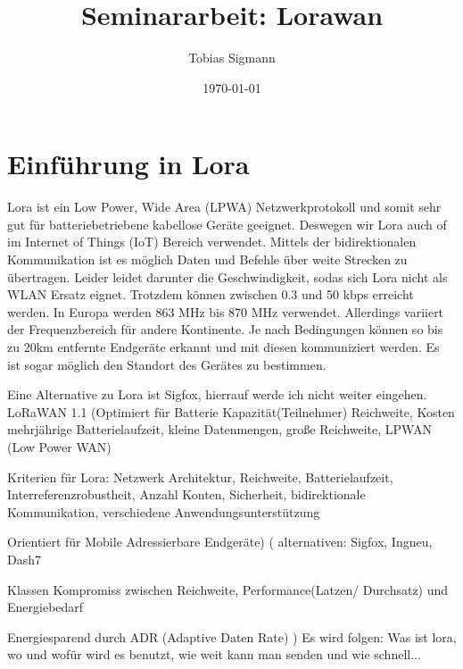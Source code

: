 \documentclass[a4paper,12pt]{article}
\author{Tobias Sigmann}
\title{Seminararbeit: Lorawan}
\date{\today}
\begin{document}
    \maketitle
    \newpage
    \tableofcontents
    \newpage

    \section{Einführung in Lora}
        Lora ist ein Low Power, Wide Area (LPWA) Netzwerkprotokoll und somit sehr gut für batteriebetriebene kabellose Geräte geeignet. Deswegen wir Lora auch of im Internet of Things (IoT) Bereich verwendet.
        Mittels der bidirektionalen Kommunikation ist es möglich Daten und Befehle über weite Strecken zu übertragen. Leider leidet darunter die Geschwindigkeit, sodas sich Lora nicht als WLAN Ersatz eignet.
        Trotzdem können zwischen 0.3 und 50 kbps erreicht werden. In Europa werden 863 MHz bis 870 MHz verwendet. Allerdings variiert der Frequenzbereich für andere Kontinente. Je nach Bedingungen können so bis zu 20km entfernte Endgeräte erkannt und mit diesen kommuniziert werden.
        Es ist sogar möglich den Standort des Gerätes zu bestimmen.
        
        Eine Alternative zu Lora ist Sigfox, hierrauf werde ich nicht weiter eingehen.
        LoRaWAN 1.1
        \newline    
        \cite{WhatIsLoRa}(Optimiert für Batterie Kapazität(Teilnehmer) Reichweite, Kosten
        mehrjährige Batterielaufzeit, kleine Datenmengen, große Reichweite, LPWAN (Low Power WAN)
        
        Kriterien für Lora: Netzwerk Architektur, Reichweite, Batterielaufzeit, Interreferenzrobustheit, Anzahl Konten, Sicherheit, bidirektionale Kommunikation, verschiedene Anwendungsunterstützung
        
        Orientiert für Mobile Adressierbare Endgeräte)
        \newline{}
            \cite{LoraLimit}(
                alternativen: Sigfox, Ingneu, Dash7

                Klassen Kompromiss zwischen Reichweite, Performance(Latzen/ Durchsatz) und Energiebedarf

                Energiesparend durch ADR (Adaptive Daten Rate)
            )
        \newline{}\newline{} Es wird folgen: Was ist lora, wo und wofür wird es benutzt, wie weit kann man senden und wie schnell...
\end{document}
